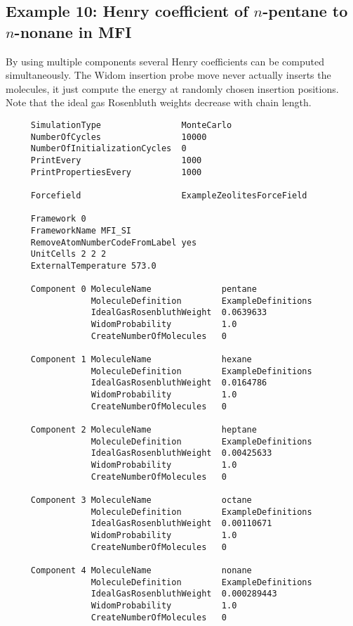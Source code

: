 \subsection*{Example 10: Henry coefficient of $n$-pentane to $n$-nonane in MFI}

By using multiple components several Henry coefficients can be computed simultaneously. The Widom insertion probe move
never actually inserts the molecules, it just compute the energy at randomly chosen insertion positions.
Note that the ideal gas Rosenbluth weights decrease with chain length.

\begin{tiny}
\begin{verbatim}
     SimulationType                MonteCarlo
     NumberOfCycles                10000
     NumberOfInitializationCycles  0
     PrintEvery                    1000
     PrintPropertiesEvery          1000

     Forcefield                    ExampleZeolitesForceField

     Framework 0
     FrameworkName MFI_SI
     RemoveAtomNumberCodeFromLabel yes
     UnitCells 2 2 2
     ExternalTemperature 573.0

     Component 0 MoleculeName              pentane
                 MoleculeDefinition        ExampleDefinitions
                 IdealGasRosenbluthWeight  0.0639633
                 WidomProbability          1.0
                 CreateNumberOfMolecules   0

     Component 1 MoleculeName              hexane
                 MoleculeDefinition        ExampleDefinitions
                 IdealGasRosenbluthWeight  0.0164786
                 WidomProbability          1.0
                 CreateNumberOfMolecules   0

     Component 2 MoleculeName              heptane
                 MoleculeDefinition        ExampleDefinitions
                 IdealGasRosenbluthWeight  0.00425633
                 WidomProbability          1.0
                 CreateNumberOfMolecules   0

     Component 3 MoleculeName              octane
                 MoleculeDefinition        ExampleDefinitions
                 IdealGasRosenbluthWeight  0.00110671
                 WidomProbability          1.0
                 CreateNumberOfMolecules   0

     Component 4 MoleculeName              nonane
                 MoleculeDefinition        ExampleDefinitions
                 IdealGasRosenbluthWeight  0.000289443
                 WidomProbability          1.0
                 CreateNumberOfMolecules   0
\end{verbatim}
\end{tiny}


